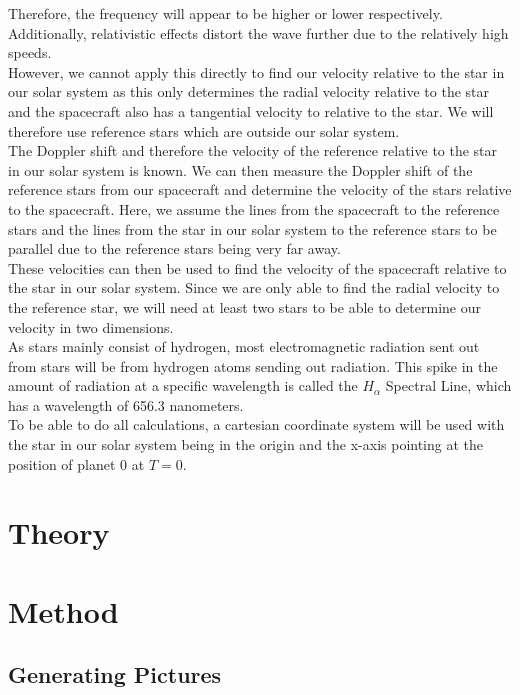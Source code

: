 \documentclass[reprint,english,notitlepage]{revtex4-2}
\begin{document}
Therefore, the frequency will appear to be higher or lower respectively.
Additionally, relativistic effects distort the wave further due to the relatively high speeds.\\
However, we cannot apply this directly to find our velocity relative to the star in our solar system as this only determines the radial velocity relative to the star and the spacecraft also has a tangential velocity to relative to the star.
We will therefore use reference stars which are outside our solar system.\\
The Doppler shift and therefore the velocity of the reference relative to the star in our solar system is known.
We can then measure the Doppler shift of the reference stars from our spacecraft and determine the velocity of the stars relative to the spacecraft.
Here, we assume the lines from the spacecraft to the reference stars and the lines from the star in our solar system to the reference stars to be parallel due to the reference stars being very far away.\\
These velocities can then be used to find the velocity of the spacecraft relative to the star in our solar system.
Since we are only able to find the radial velocity to the reference star, we will need at least two stars to be able to determine our velocity in two dimensions.\\
As stars mainly consist of hydrogen, most electromagnetic radiation sent out from stars will be from hydrogen atoms sending out radiation.
This spike in the amount of radiation at a specific wavelength is called the $H_{\alpha}$ Spectral Line, which has a wavelength of 656.3 nanometers.\\
To be able to do all calculations, a cartesian coordinate system will be used with the star in our solar system being in the origin and the x-axis pointing at the position of planet 0 at $T = 0$.

\section{Theory} \label{sec:theory}

\section{Method} \label{sec:method}
\subsection{Generating Pictures} \label{subsec: generating pictures}
\end{document}
